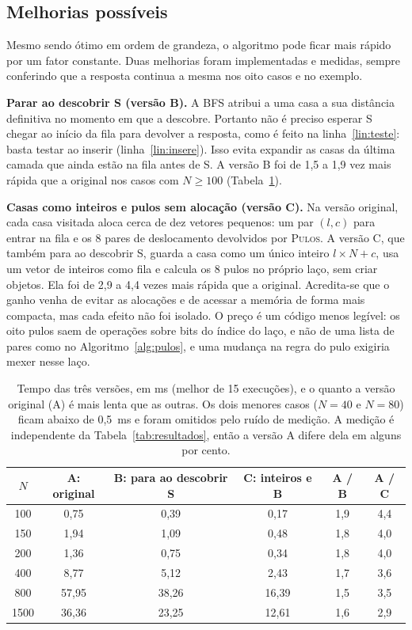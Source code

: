 \subsection{Melhorias possíveis}
\label{sec:melhorias}

Mesmo sendo ótimo em ordem de grandeza, o algoritmo pode ficar mais rápido por um fator
constante. Duas melhorias foram implementadas e medidas, sempre conferindo que a resposta continua a
mesma nos oito casos e no exemplo.

\textbf{Parar ao descobrir S (versão B).} A BFS atribui a uma casa a sua distância definitiva
no momento em que a descobre. Portanto não é preciso esperar S chegar ao início da fila para
devolver a resposta, como é feito na linha~\ref{lin:teste}: basta testar ao inserir
(linha~\ref{lin:insere}). Isso evita expandir as casas da última camada que ainda estão na fila
antes de S. A versão B foi de 1,5 a 1,9 vez mais rápida que a original nos casos com $N \ge 100$
(Tabela~\ref{tab:melhorias}).

\textbf{Casas como inteiros e pulos sem alocação (versão C).} Na versão original, cada casa
visitada aloca cerca de dez vetores pequenos: um par $(l, c)$ para entrar na fila e os 8 pares
de deslocamento devolvidos por \textsc{Pulos}. A versão C, que também para ao descobrir S,
guarda a casa como um único inteiro $l \times N + c$, usa um vetor de inteiros como fila e
calcula os 8 pulos no próprio laço, sem criar objetos. Ela foi de 2,9 a 4,4 vezes mais rápida que
a original. Acredita-se que o ganho venha de evitar as alocações e de acessar a memória de forma
mais compacta, mas cada efeito não foi isolado. O preço é um código menos legível: os oito
pulos saem de operações sobre bits do índice do laço, e não de uma lista de pares como no
Algoritmo~\ref{alg:pulos}, e uma mudança na regra do pulo exigiria mexer nesse laço.

\begin{table}[ht]
  \centering
  \caption{Tempo das três versões, em ms (melhor de 15 execuções), e o quanto a versão original
  (A) é mais lenta que as outras. Os dois menores casos ($N = 40$ e $N = 80$) ficam abaixo de 0,5~ms e
  foram omitidos pelo ruído de medição. A medição é independente da Tabela~\ref{tab:resultados}, então a
  versão A difere dela em alguns por cento.}
  \label{tab:melhorias}
  \small
  \begin{tabular}{|c|c|c|c|c|c|}
    \hline
    \textbf{$N$} & \textbf{A: original} & \textbf{B: para ao descobrir S}
      & \textbf{C: inteiros e B} & \textbf{A / B} & \textbf{A / C}\\
    \hline
    100 & 0,75 & 0,39 & 0,17 & 1,9 & 4,4\\
    \hline
    150 & 1,94 & 1,09 & 0,48 & 1,8 & 4,0\\
    \hline
    200 & 1,36 & 0,75 & 0,34 & 1,8 & 4,0\\
    \hline
    400 & 8,77 & 5,12 & 2,43 & 1,7 & 3,6\\
    \hline
    800 & 57,95 & 38,26 & 16,39 & 1,5 & 3,5\\
    \hline
    1500 & 36,36 & 23,25 & 12,61 & 1,6 & 2,9\\
    \hline
  \end{tabular}
\end{table}

